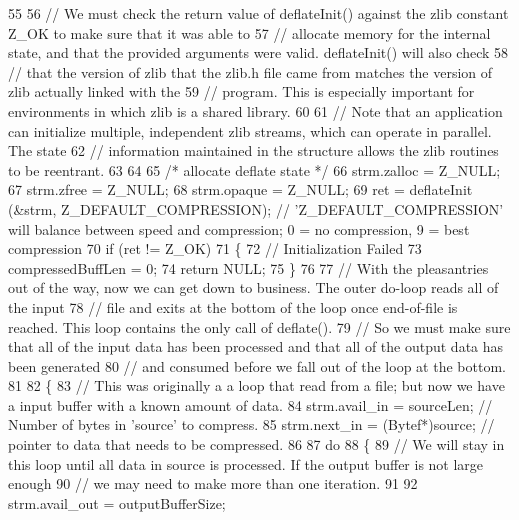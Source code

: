 \begin{DoxyCode}
55 
56   \textcolor{comment}{// We must check the return value of deflateInit() against the zlib constant Z\_OK to make sure that it
       was able to}
57   \textcolor{comment}{// allocate memory for the internal state, and that the provided arguments were valid. deflateInit() will
       also check}
58   \textcolor{comment}{// that the version of zlib that the zlib.h file came from matches the version of zlib actually linked
       with the}
59   \textcolor{comment}{// program. This is especially important for environments in which zlib is a shared library.}
60 
61   \textcolor{comment}{// Note that an application can initialize multiple, independent zlib streams, which can operate in
       parallel. The state}
62   \textcolor{comment}{// information maintained in the structure allows the zlib routines to be reentrant.}
63 
64 
65   \textcolor{comment}{/* allocate deflate state */}
66   strm.zalloc  = Z\_NULL;
67   strm.zfree   = Z\_NULL;
68   strm.opaque  = Z\_NULL;
69   ret = deflateInit (&strm, Z\_DEFAULT\_COMPRESSION);   \textcolor{comment}{// 'Z\_DEFAULT\_COMPRESSION' will balance between speed
       and compression;  0 = no compression,  9 = best compression}
70   \textcolor{keywordflow}{if}  (ret != Z\_OK)
71   \{
72     \textcolor{comment}{// Initialization Failed}
73     compressedBuffLen = 0;
74     \textcolor{keywordflow}{return} NULL;
75   \}
76 
77   \textcolor{comment}{//  With the pleasantries out of the way, now we can get down to business. The outer do-loop reads all of
       the input}
78   \textcolor{comment}{// file and exits at the bottom of the loop once end-of-file is reached. This loop contains the only call
       of deflate().}
79   \textcolor{comment}{// So we must make sure that all of the input data has been processed and that all of the output data has
       been generated}
80   \textcolor{comment}{// and consumed before we fall out of the loop at the bottom.}
81 
82   \{
83     \textcolor{comment}{// This was originally a a loop that read from a file;  but now we have a input buffer with a known
       amount of data.}
84     strm.avail\_in = sourceLen;       \textcolor{comment}{// Number of bytes in 'source'  to compress.}
85     strm.next\_in  = (Bytef*)source;  \textcolor{comment}{// pointer to data that needs to be compressed.}
86     
87     \textcolor{keywordflow}{do}
88     \{ 
89       \textcolor{comment}{// We will stay in this loop until all data in source is processed.  If the output buffer is not
       large enough }
90       \textcolor{comment}{// we may need to make more than one iteration.}
91 
92       strm.avail\_out = outputBufferSize;

\end{DoxyCode}
